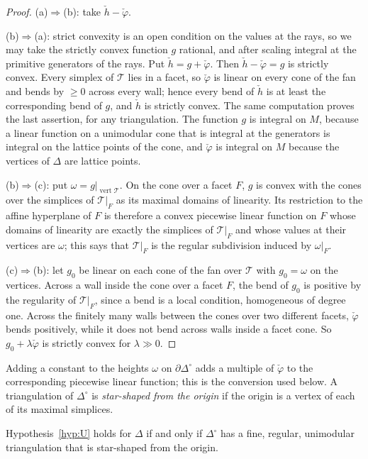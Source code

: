 \begin{proof}
(a)$\Rightarrow$(b): take $\check h-\check\varphi$.

(b)$\Rightarrow$(a): strict convexity is an open condition on the values at the rays, so we may take the strictly convex
function $g$ rational, and after scaling integral at the primitive generators of the rays. Put $\check h=g+\check\varphi$.
Then $\check h-\check\varphi=g$ is strictly convex. Every simplex of $\mathcal T$ lies in a facet, so $\check\varphi$ is
linear on every cone of the fan and bends by $\ge0$ across every wall; hence every bend of $\check h$ is at least the
corresponding bend of $g$, and $\check h$ is strictly convex. The same computation proves the last assertion, for any triangulation. The
function $g$ is integral on $M$, because a linear function on a unimodular cone that is integral at the generators is
integral on the lattice points of the cone, and $\check\varphi$ is integral on $M$ because the vertices of $\Delta$ are
lattice points.

(b)$\Rightarrow$(c): put $\omega=g|_{\operatorname{vert}\mathcal T}$. On the cone over a facet $F$, $g$ is convex with the cones
over the simplices of $\mathcal T|_F$ as its maximal domains of linearity. Its restriction to the affine hyperplane of $F$
is therefore a convex piecewise linear function on $F$ whose domains of linearity are exactly the simplices of
$\mathcal T|_F$ and whose values at their vertices are $\omega$; this says that $\mathcal T|_F$ is the regular subdivision
induced by $\omega|_F$.

(c)$\Rightarrow$(b): let $g_0$ be linear on each cone of the fan over $\mathcal T$ with $g_0=\omega$ on the vertices. Across a
wall inside the cone over a facet $F$, the bend of $g_0$ is positive by the regularity of $\mathcal T|_F$, since a bend is
a local condition, homogeneous of degree one. Across the finitely many walls between the cones over two different facets,
$\check\varphi$ bends positively, while it does not bend across walls inside a facet cone. So $g_0+\lambda\check\varphi$
is strictly convex for $\lambda\gg0$.
\end{proof}

Adding a constant to the heights $\omega$ on $\partial\Delta^\circ$ adds a multiple of $\check\varphi$ to the corresponding
piecewise linear function; this is the conversion used below. A triangulation of $\Delta^\circ$ is \emph{star-shaped from
the origin} if the origin is a vertex of each of its maximal simplices.

\begin{corollary}\label{cor:Ureform}
Hypothesis~\ref{hyp:U} holds for $\Delta$ if and only if $\Delta^\circ$ has a fine, regular, unimodular
triangulation that is star-shaped from the origin.
\end{corollary}

